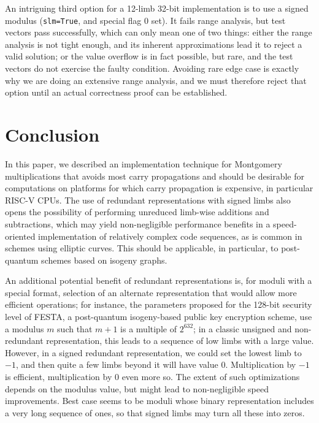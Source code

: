 \documentclass{llncs}
\begin{document}
An intriguing third option for a 12-limb 32-bit implementation is to
use a signed modulus (\verb+slm=True+, and special flag 0 set). It fails
range analysis, but test vectors pass successfully, which can only mean
one of two things: either the range analysis is not tight enough, and
its inherent approximations lead it to reject a valid solution; or the
value overflow is in fact possible, but rare, and the test vectors do
not exercise the faulty condition. Avoiding rare edge case is exactly
why we are doing an extensive range analysis, and we must therefore
reject that option until an actual correctness proof can be established.


\newpage
\section{Conclusion}\label{sec:conclusion}

In this paper, we described an implementation technique for Montgomery
multiplications that avoids most carry propagations and should be
desirable for computations on platforms for which carry propagation is
expensive, in particular RISC-V CPUs. The use of redundant
representations with signed limbs also opens the possibility of
performing unreduced limb-wise additions and subtractions, which may
yield non-negligible performance benefits in a speed-oriented
implementation of relatively complex code sequences, as is common in
schemes using elliptic curves. This should be applicable, in particular,
to post-quantum schemes based on isogeny graphs.

An additional potential benefit of redundant representations is, for
moduli with a special format, selection of an alternate representation
that would allow more efficient operations; for instance, the parameters
proposed for the 128-bit security level of FESTA\cite{BasMaiPop2023}, a
post-quantum isogeny-based public key encryption scheme, use a modulus
$m$ such that $m+1$ is a multiple of $2^{632}$; in a classic unsigned
and non-redundant representation, this leads to a sequence of low limbs
with a large value. However, in a signed redundant representation, we
could set the lowest limb to $-1$, and then quite a few limbs beyond it
will have value $0$. Multiplication by $-1$ is efficient, multiplication
by $0$ even more so. The extent of such optimizations depends on the
modulus value, but might lead to non-negligible speed improvements. Best
case seems to be moduli whose binary representation includes a very long
sequence of ones, so that signed limbs may turn all these into zeros.
\end{document}
